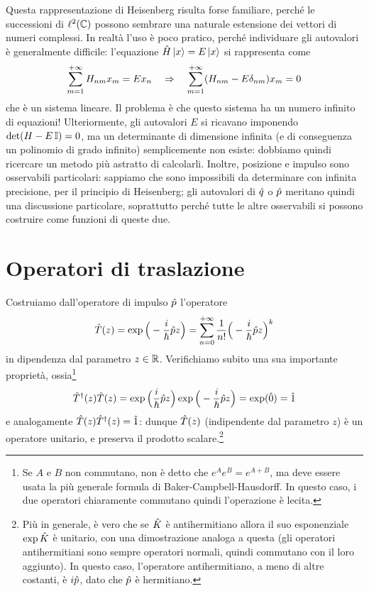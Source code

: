 Questa rappresentazione di Heisenberg risulta forse familiare, perch\'e le successioni di $\ell^2(\mathbb{C})$ possono sembrare una naturale estensione dei vettori di numeri complessi.
In realtà l'uso è poco pratico, perch\'e individuare gli autovalori è generalmente difficile: l'equazione $\hat{H}\left|{x}\right\rangle=E\left|{x}\right\rangle$ si rappresenta come
\begin{equation}
	\sum_{{m}=1}^{+\infty}H_{nm}x_m=Ex_n\quad\Rightarrow\quad\sum_{{m}=1}^{+\infty}(H_{nm}-E\delta_{nm})x_m=0
\end{equation}
che è un sistema lineare.
Il problema è che questo sistema ha un numero infinito di equazioni!
Ulteriormente, gli autovalori $E$ si ricavano imponendo $\det(H-E\operatorname{\mathbb{I}})=0$, ma un determinante di dimensione infinita (e di conseguenza un polinomio di grado infinito) semplicemente non esiste: dobbiamo quindi ricercare un metodo più astratto di calcolarli.
Inoltre, posizione e impulso sono osservabili particolari: sappiamo che sono impossibili da determinare con infinita precisione, per il principio di Heisenberg; gli autovalori di $\hat{q}$ o $\hat{p}$ meritano quindi una discussione particolare, soprattutto perch\'e tutte le altre osservabili si possono costruire come funzioni di queste due.

\section{Operatori di traslazione}
Costruiamo dall'operatore di impulso $\hat{p}$ l'operatore
\begin{equation}
	\hat{T}(z)=\exp\Big(-\frac{i}{\hbar}\hat{p} z\Big)=\sum_{{n}=0}^{+\infty}\frac1{n!}\Big(-\frac{i}{\hbar}\hat{p} z\Big)^k
	\label{eq:operatore-traslazione}
\end{equation}
in dipendenza dal parametro $z\in\mathbb{R}$.
Verifichiamo subito una sua importante proprietà, ossia\footnote{Se $A$ e $B$ non commutano, non è detto che $e^Ae^B=e^{A+B}$, ma deve essere usata la più generale formula di Baker-Campbell-Hausdorff. In questo caso, i due operatori chiaramente commutano quindi l'operazione è lecita.}
\begin{equation}
	{\hat{T}}^\dagger(z)\hat{T}(z)=\exp\Big(\frac{i}{\hbar}\hat{p}z\Big)\exp\Big(-\frac{i}{\hbar}\hat{p}z\Big)=\exp(\hat{0})=\hat{1}
	\label{eq:unitarieta-traslazione}
\end{equation}
e analogamente $\hat{T}(z){\hat{T}}^\dagger(z)=\hat{1}$: dunque $\hat{T}(z)$ (indipendente dal parametro $z$) è un operatore unitario, e preserva il prodotto scalare.\footnote{Più in generale, è vero che se $\hat{K}$ è antihermitiano allora il suo esponenziale $\exp\hat{K}$ è unitario, con una dimostrazione analoga a questa (gli operatori antihermitiani sono sempre operatori normali, quindi commutano con il loro aggiunto). In questo caso, l'operatore antihermitiano, a meno di altre costanti, è $i\hat{p}$, dato che $\hat{p}$ è hermitiano.} 

